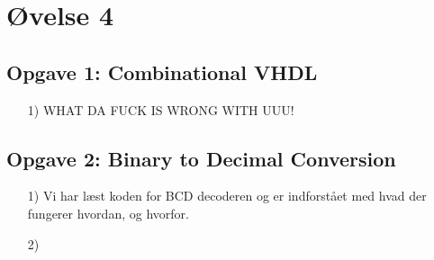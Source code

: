 \section{Øvelse 4}
\subsection{Opgave 1: Combinational VHDL}
\begin{enumerate}
	\item[1)]
WHAT DA FUCK IS WRONG WITH UUU!
	
\end{enumerate}


\subsection{Opgave 2: Binary to Decimal Conversion}
\begin{enumerate}
	\item[1)]
	Vi har læst koden for BCD decoderen og er indforstået med hvad der fungerer hvordan, og hvorfor.
	
	\item[2)]
	
	
\end{enumerate}